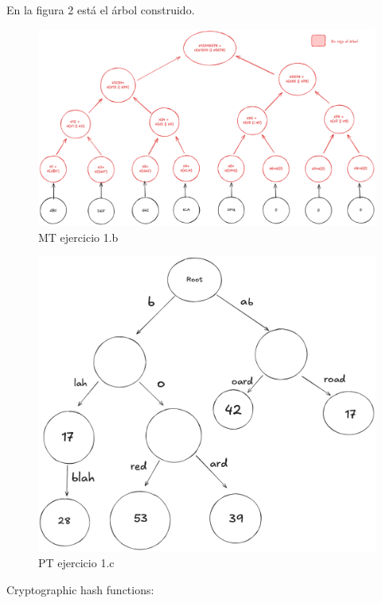\documentclass[12pt,addpoints,answers]{exam}
\begin{document}
\begin{questions}
\begin{parts}
\begin{solution}
        En la figura 2 está el árbol construido.
    \end{solution}  
\end{parts}
    \begin{figure}[h]
        \centering
        \includegraphics [width=0.8 \textwidth]{mt.png}
        \caption{MT ejercicio 1.b}
    \end{figure}    

    \begin{figure}[h]
        \centering
        \includegraphics [width=0.8 \textwidth]{pt.png}
        \caption{PT ejercicio 1.c}
    \end{figure} 
\newpage




\question Cryptographic hash functions:

\end{questions}
\end{document}
